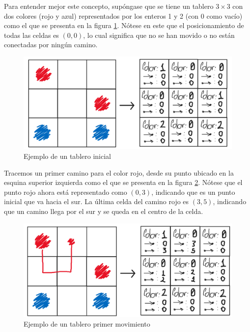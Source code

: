 \documentclass[letter,12pt]{article}
\begin{document}
Para entender mejor este concepto, supóngase que se tiene un tablero $3 \times 3$ con dos colores (rojo y azul) representados por los enteros 1 y 2 (con 0 como vacío) como el que se presenta en la figura \ref{fig:ejemplo_tablero_inicial}. Nótese en este que el posicionamiento de todas las celdas es $(0, 0)$, lo cual significa que no se han movido o no están conectadas por ningún camino. \par

\begin{figure}[ht!]
	\centering
	\includegraphics[scale=0.35]{img/example_grid_initial.png}
	\caption{Ejemplo de un tablero inicial}
	\label{fig:ejemplo_tablero_inicial}
\end{figure}

Tracemos un primer camino para el color rojo, desde su punto ubicado en la esquina superior izquierda como el que se presenta en la figura \ref{fig:ejemplo_tablero_mov1}. Nótese que el punto rojo ahora está representado como $(0,3)$, indicando que es un punto inicial que va hacia el sur. La última celda del camino rojo es $(3,5)$, indicando que un camino llega por el sur y se queda en el centro de la celda. \par

\begin{figure}[ht!]
	\centering
	\includegraphics[scale=0.35]{img/example_grid_mov1.png}
	\caption{Ejemplo de un tablero primer movimiento}
	\label{fig:ejemplo_tablero_mov1}
\end{figure}
\end{document}
